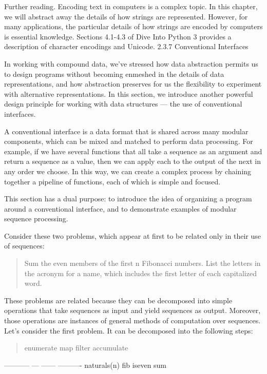 \documentclass[letterpaper,10pt,dvipdfmx]{sphinxmanual}
\begin{document}
Further reading. Encoding text in computers is a complex topic. In this chapter, we will abstract away the details of how strings are represented. However, for many applications, the particular details of how strings are encoded by computers is essential knowledge. Sections 4.1-4.3 of Dive Into Python 3 provides a description of character encodings and Unicode.
2.3.7   Conventional Interfaces

In working with compound data, we've stressed how data abstraction permits us to design programs without becoming enmeshed in the details of data representations, and how abstraction preserves for us the flexibility to experiment with alternative representations. In this section, we introduce another powerful design principle for working with data structures --- the use of conventional interfaces.

A conventional interface is a data format that is shared across many modular components, which can be mixed and matched to perform data processing. For example, if we have several functions that all take a sequence as an argument and return a sequence as a value, then we can apply each to the output of the next in any order we choose. In this way, we can create a complex process by chaining together a pipeline of functions, each of which is simple and focused.

This section has a dual purpose: to introduce the idea of organizing a program around a conventional interface, and to demonstrate examples of modular sequence processing.

Consider these two problems, which appear at first to be related only in their use of sequences:
\begin{quote}

Sum the even members of the first n Fibonacci numbers.
List the letters in the acronym for a name, which includes the first letter of each capitalized word.
\end{quote}

These problems are related because they can be decomposed into simple operations that take sequences as input and yield sequences as output. Moreover, those operations are instances of general methods of computation over sequences. Let's consider the first problem. It can be decomposed into the following steps:
\begin{quote}

enumerate     map    filter  accumulate
\end{quote}

-----------    ---    ------  ----------
naturals(n)    fib    iseven     sum
\end{document}
